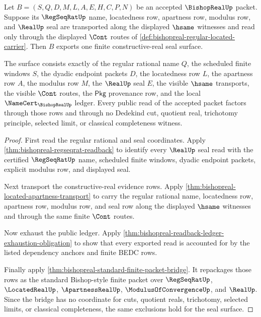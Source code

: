 \begin{theorem}
\label{thm:bishopreal-regular-cauchy-located-real-seal}
Let $B=(S,Q,D,M,L,A,E,H,C,P,N)$ be an accepted $\BishopRealUp$ packet. Suppose
its $\RegSeqRatUp$ name, locatedness row, apartness row, modulus row, and
$\RealUp$ seal are transported along the displayed $\hsame$ witnesses and read
only through the displayed $\Cont$ routes of
\autoref{def:bishopreal-regular-located-carrier}. Then $B$ exports one finite
constructive-real seal surface.

The surface consists exactly of the regular rational name $Q$, the scheduled
finite windows $S$, the dyadic endpoint packets $D$, the locatedness row $L$,
the apartness row $A$, the modulus row $M$, the $\RealUp$ seal $E$, the
visible $\hsame$ transports, the visible $\Cont$ routes, the $\mathsf{Pkg}$
provenance row, and the local $\NameCert_{\BishopRealUp}$ ledger. Every public
read of the accepted packet factors through those rows and through no
Dedekind cut, quotient real, trichotomy principle, selected limit, or
classical completeness witness.
\end{theorem}
\begin{proof}
First read the regular rational and seal coordinates. Apply
\autoref{thm:bishopreal-regseqrat-readback} to identify every $\RealUp$ seal
read with the certified $\RegSeqRatUp$ name, scheduled finite windows,
dyadic endpoint packets, explicit modulus row, and displayed seal.

Next transport the constructive-real evidence rows. Apply
\autoref{thm:bishopreal-located-apartness-transport} to carry the regular
rational name, locatedness row, apartness row, modulus row, and seal row along
the displayed $\hsame$ witnesses and through the same finite $\Cont$ routes.

Now exhaust the public ledger. Apply
\autoref{thm:bishopreal-readback-ledger-exhaustion-obligation} to show that
every exported read is accounted for by the listed dependency anchors and
finite BEDC rows.

Finally apply \autoref{thm:bishopreal-standard-finite-packet-bridge}. It
repackages those rows as the standard Bishop-style finite packet over
$\RegSeqRatUp$, $\LocatedRealUp$, $\ApartnessRealUp$,
$\ModulusOfConvergenceUp$, and $\RealUp$. Since the bridge has no coordinate
for cuts, quotient reals, trichotomy, selected limits, or classical
completeness, the same exclusions hold for the seal surface.
\end{proof}

